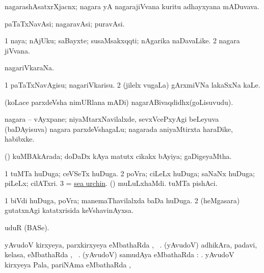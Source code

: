 \bentry
{} 
\gl{\nA}
\expl{}
\bmng
nagarashAsatxrXjacnx; nagara yA nagarajiVvana kuritu adhayxyana mADuvava. 
\emng
\eentry

\bentry
{} 
\gl{\nA}
\expl{}
\bmng
paTaTxNavAsi; nagaravAsi; puravAsi. 
\emng
\eentry

\bentry
{} 
\gl{\nA}
\bmng
\bnum
\num{1} naya; nAjUku; saBayxte; susaMsakxqqti; nAgarika naDavaLike. 
\num{2} nagara jiVvana. 
\enum
\emng
\eentry

\bentry
{} 
\gl{\nA}
\expl{}
\bmng
nagariVkaraNa. 
\emng
\eentry

\bentry
{} 
\gl{\sakirx}
\expl{}
\bmng
\bnum
\num{1} paTaTxNavAgisu; nagariVkarisu. 
\num{2} (jilelx \mo vugaLa) gArxmiVNa lakaSxNa kaLe. 
\enum
\emng
\eentry

\bentry
{}
\gl{\nA}
\expl{}
\bmng
(koLace parxdeVsha nimURlana mADi) nagarABivaqdidhx(goLisuvudu). 
\emng
\eentry

\bentry
{}
\gl{\nA}
\expl{}
\bmng
nagara -- vAyxpane; niyaMtarxNavilalxde, sevxVcePxyAgi beLeyuva (baDAyisuva) nagara parxdeVshagaLu; nagarada aniyaMtirxta haraDike, habibxke. 
\emng
\eentry

\bentry
{} 
\gl{\gu}
\bmng
(\savi) kuMBAkArada; doDaDx kAya matutx cikakx bAyiya; gaDigeyaMtha. 
\emng
\eentry

\bentry
{} 
\gl{\nA}
\bmng
\bnum
\num{1} tuMTa huDuga; ceVSeTx huDuga. 
\num{2} poVra; ciLeLx huDuga; saNaNx huDuga; piLeLx; cilATxri. 
\num{3} = \hyperref{kandict_s.pdf}{S}{sea urchin}{sea urchin}. 
 (\pArxparx) 
\banum
{} muLuLxhaMdi. 
 tuMTa pishAci. 
\eanum
\numie
\enum
\emng

\noindent 
\gl{\pagu}
\expl{}
\bmng
\bnum
\num{1}  biVdi huDuga, poVra; manemaThavilalxda baDa huDuga. 
\num{2} (heMgasara) gutatxnAgi katatxrisida keVshavinAyxsa. 
\enum
\emng
\eentry

\bentry
{} 
\gl{\nA}
\expl{}
\bmng
uduR (BASe). 
\emng
\eentry

\bentry
{}
\gl{\uparx}
\expl{}
\bmng
\banum
{} yAvudoV kirxyeya, parxkirxyeya eMbathaRda \uparx, \udA\ . 
 (yAvudoV) adhikAra, padavi, kelasa, eMbathaRda \uparx, \udA\ . 
 (yAvudoV) samudAya eMbathaRda \uparx: . 
 yAvudoV kirxyeya Pala, pariNAma eMbathaRda \uparx, \udA\  
\eanum
\emng
\eentry

